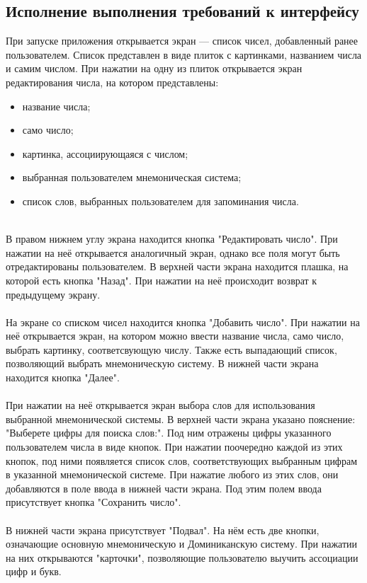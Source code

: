 \documentclass[draft]{article}
\begin{document}
\subsection{Исполнение выполнения требований к интерфейсу}
При запуске приложения открывается экран — список чисел, добавленный ранее пользователем. Список представлен в виде плиток с картинками, названием числа и самим числом. При нажатии на одну из плиток открывается экран редактирования числа, на котором представлены:
\begin{itemize}
\item название числа;
\item само число;
\item картинка, ассоциирующаяся с числом;
\item выбранная пользователем мнемоническая система;
\item список слов, выбранных пользователем для запоминания числа. 
\end{itemize}
~\\
В правом нижнем углу экрана находится кнопка "{}Редактировать число"{}. При нажатии на неё открывается аналогичный экран, однако все поля могут быть отредактированы пользователем. В верхней части экрана находится плашка, на которой есть кнопка "{}Назад"{}. При нажатии на неё происходит возврат к предыдущему экрану.\\
~\\
На экране со списком чисел находится кнопка "{}Добавить число"{}. При нажатии на неё открывается экран, на котором можно ввести название числа, само число, выбрать картинку, соответсвующую числу. Также есть выпадающий список, позволяющий выбрать мнемоническую систему. В нижней части экрана находится кнопка "{}Далее"{}.\\
~\\
При нажатии на неё открывается экран выбора слов для использования выбранной мнемонической системы. В верхней части экрана указано пояснение: "Выберете цифры для поиска слов:". Под ним отражены
цифры указанного пользователем числа в виде кнопок. При нажатии поочередно каждой из этих кнопок,
под ними появляется список слов, соответствующих выбранным цифрам в указанной мнемонической
системе. При нажатие любого из этих слов, они добавляются в поле ввода в нижней части экрана. Под
этим полем ввода присутствует кнопка "Сохранить число".\\
~\\
В нижней части экрана присутствует "{}Подвал"{}. На нём есть две кнопки, означающие основную мнемоническую и Доминиканскую систему. При нажатии на них открываются "{}карточки"{}, позволяющие пользователю выучить ассоциации цифр и букв.\\
\end{document}
